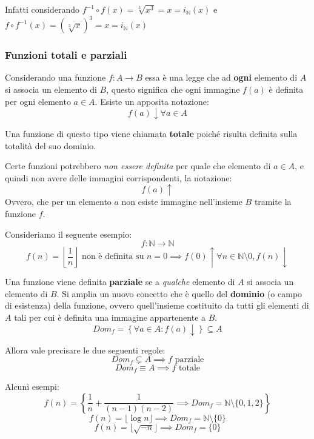 \documentclass{article}
\begin{document}
Infatti considerando $f^{-1}\circ f(x) = \sqrt[3]{x^3}=x=i_\mathbb{N}(x)$ e $f\circ f^{-1}(x)=(\sqrt[3]{x})^3=x=i_\mathbb{N}(x)$

\subsubsection{Funzioni totali e parziali}
Considerando una funzione $f:A\rightarrow B$ essa è una legge che ad \textbf{ogni} elemento di $A$ si associa
un elemento di $B$, questo significa che ogni immagine $f(a)$ è definita per ogni elemento $a\in A$. Esiste
un apposita notazione:
$$f(a)\downarrow \forall a\in A$$

Una funzione di questo tipo viene chiamata \textbf{totale} poiché risulta definita sulla totalità del suo dominio.

Certe funzioni potrebbero \textit{non essere definita} per quale che elemento di $a\in A$, e quindi non avere delle immagini corrispondenti, la notazione:
$$f(a)\uparrow$$
Ovvero, che per un elemento $a$ non esiste immagine nell'insieme $B$ tramite la funzione $f$.

Consideriamo il seguente esempio:
$$f:\mathbb{N}\rightarrow\mathbb{N}$$
$$f(n)=\left\lfloor\frac{1}{n}\right\rfloor \text{ non è definita su } n=0\implies f(0)\uparrow \forall n\in\mathbb{N}\setminus{0}, f(n)\downarrow$$

Una funzione viene definita \textbf{parziale} se a \textit{qualche} elemento di $A$ si associa un elemento di $B$. Si amplia un nuovo concetto che è quello del \textbf{dominio} (o campo di esistenza) della funzione,
ovvero quell'insieme costituito da tutti gli elementi di $A$ tali per cui è definita una immagine appartenente a $B$.
$$Dom_f=\left\{\forall a\in A : f(a)\downarrow \right\}\subseteq A$$

Allora vale precisare le due seguenti regole:
$$Dom_f\subsetneq A\implies f\text{ parziale}$$
$$Dom_f\equiv A\implies f \text{ totale}$$

Alcuni esempi:
$$f(n)=\left\{\frac{1}{n}+\frac{1}{(n-1)(n-2)}\implies Dom_f=\mathbb{N}\setminus\{0,1,2\}\right\}$$
$$f(n)=\lfloor\log{n}\rfloor\implies Dom_f=\mathbb{N}\setminus\{0\}$$
$$f(n)=\lfloor\sqrt{-n}\rfloor \implies Dom_f=\{0\}$$
\end{document}
